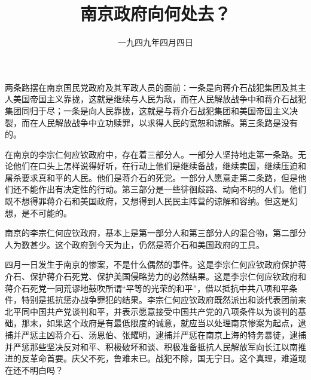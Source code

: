 
\title{南京政府向何处去？}
\date{一九四九年四月四日}
\maketitle


两条路摆在南京国民党政府及其军政人员的面前：一条是向蒋介石战犯集团及其主人美国帝国主义靠拢，这就是继续与人民为敌，而在人民解放战争中和蒋介石战犯集团同归于尽；一条是向人民靠拢，这就是与蒋介石战犯集团和美国帝国主义决裂，而在人民解放战争中立功赎罪，以求得人民的宽恕和谅解。第三条路是没有的。

在南京的李宗仁何应钦政府中，存在着三部分人。一部分人坚持地走第一条路。无论他们在口头上怎样说得好听，在行动上他们是继续备战，继续卖国，继续压迫和屠杀要求真和平的人民。他们是蒋介石的死党。一部分人愿意走第二条路，但是他们还不能作出有决定性的行动。第三部分是一些徘徊歧路、动向不明的人们。他们既不想得罪蒋介石和美国政府，又想得到人民民主阵营的谅解和容纳。但这是幻想，是不可能的。

南京的李宗仁何应钦政府，基本上是第一部分人和第三部分人的混合物，第二部分人为数甚少。这个政府到今天为止，仍然是蒋介石和美国政府的工具。

四月一日发生于南京的惨案，不是什么偶然的事件。这是李宗仁何应钦政府保护蒋介石、保护蒋介石死党、保护美国侵略势力的必然结果。这是李宗仁何应钦政府和蒋介石死党一同荒谬地鼓吹所谓“平等的光荣的和平”，借以抵抗中共八项和平条件，特别是抵抗惩办战争罪犯的结果。李宗仁何应钦政府既然派出和谈代表团前来北平同中国共产党谈判和平，并表示愿意接受中国共产党的八项条件以为谈判的基础，那末，如果这个政府是有最低限度的诚意，就应当以处理南京惨案为起点，逮捕并严惩主凶蒋介石、汤恩伯、张耀明，逮捕并严惩在南京上海的特务暴徒，逮捕并严惩那些坚决反对和平、积极破坏和谈、积极准备抵抗人民解放军向长江以南推进的反革命首要。庆父不死，鲁难未已。战犯不除，国无宁日。这个真理，难道现在还不明白吗？

